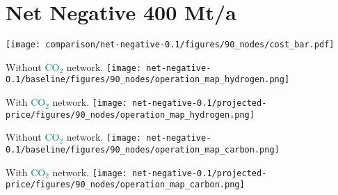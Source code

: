 \documentclass[12pt, aspectratio=169]{beamer}
\newcommand{\carbon}{\textcolor{teal}{CO$_2$}}
\begin{document}
\section{Net Negative 400 Mt/a}

\begin{frame}
    \texttt{[image: comparison/net-negative-0.1/figures/90\_nodes/cost\_bar.pdf]}
\end{frame}


\begin{frame}
    \begin{center}
    Without \carbon{} network.
    \texttt{[image: net-negative-0.1/baseline/figures/90\_nodes/operation\_map\_hydrogen.png]}
    \end{center}
\end{frame}


\begin{frame}
    \begin{center}
    With \carbon{} network.
    \texttt{[image: net-negative-0.1/projected-price/figures/90\_nodes/operation\_map\_hydrogen.png]}
    \end{center}
\end{frame}


\begin{frame}
    \begin{center}
    Without \carbon{} network.
    \texttt{[image: net-negative-0.1/baseline/figures/90\_nodes/operation\_map\_carbon.png]}
    \end{center}
\end{frame}


\begin{frame}
    \begin{center}
    With \carbon{} network.
    \texttt{[image: net-negative-0.1/projected-price/figures/90\_nodes/operation\_map\_carbon.png]}
    \end{center}
\end{frame}
\end{document}
